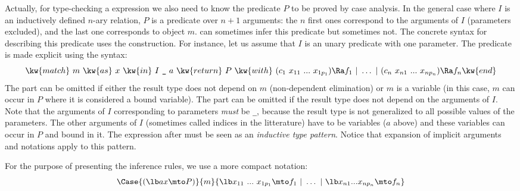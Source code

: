 Actually, for type-checking a 
expression we also need to know the predicate $P$ to be proved by case
analysis. In the general case where $I$ is an inductively defined
$n$-ary relation, $P$ is a predicate over $n+1$ arguments: the $n$ first ones
correspond to the arguments of $I$ (parameters excluded), and the last
one corresponds to object $m$. \Coq{} can sometimes infer this
predicate but sometimes not. The concrete syntax for describing this
predicate uses the  construction. For
instance, let us assume that $I$ is an unary predicate with one
parameter. The predicate is made explicit using the syntax:
\[\kw{match}~m~\kw{as}~ x~ \kw{in}~ I~\verb!_!~a~ \kw{return}~ P
 ~\kw{with}~ (c_1~x_{11}~...~x_{1p_1}) \Ra f_1 ~|~\ldots~|~
  (c_n~x_{n1}~...~x_{np_n}) \Ra f_n \kw{end}\]
The  part can be omitted if either the result type does not
depend on $m$ (non-dependent elimination) or $m$ is a variable (in
this case, $m$ can occur in $P$ where it is considered a bound variable).
The  part can be
omitted if the result type does not depend on the arguments of
$I$. Note that the arguments of $I$ corresponding to parameters
\emph{must} be \verb!_!, because the result type is not generalized to
all possible values of the parameters. The other arguments of $I$
(sometimes called indices in the litterature) have to be variables
($a$ above) and these variables can occur in $P$ and bound in it.
The expression after 
must be seen as an \emph{inductive type pattern}. Notice that
expansion of implicit arguments and notations apply to this pattern.

For the purpose of presenting the inference rules, we use a more
compact notation:
\[ \Case{(\lb a x \mto P)}{m}{ \lb x_{11}~...~x_{1p_1} \mto f_1 ~|~\ldots~|~
  \lb x_{n1}...x_{np_n} \mto f_n}\]

%

